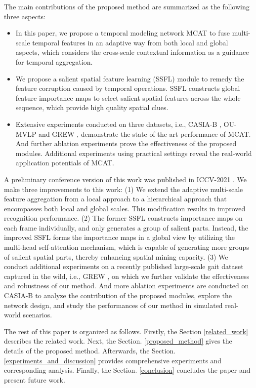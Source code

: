 \documentclass[journal]{IEEEtran}
\begin{document}
The main contributions of the proposed method are summarized as the following three aspects:
\begin{itemize}
\item[] In this paper, we propose a temporal modeling network MCAT to fuse multi-scale temporal features in an adaptive way from both local and global aspects, which considers the cross-scale contextual information as a guidance for temporal aggregation. 
   
\item[] We propose a salient spatial feature learning (SSFL) module to remedy the feature corruption caused by temporal operations. SSFL constructs global feature importance maps to select salient spatial features across the whole sequence, which provide high quality spatial clues.

\item[] Extensive experiments conducted on three datasets, i.e., CASIA-B \cite{yu2006framework}, OU-MVLP \cite{takemura2018multi} and GREW \cite{grew}, demonstrate the state-of-the-art performance of MCAT. And further ablation experiments prove the effectiveness of the proposed modules. Additional experiments using practical settings reveal the real-world application potentials of MCAT. 
\end{itemize}
 
A preliminary conference version of this work was published in ICCV-2021 \cite{cstl}. We make three improvements to this work: (1) We extend the adaptive multi-scale feature aggregation from a local approach to a hierarchical approach that encompasses both local and global scales. This modification results in improved recognition performance.  (2) The former SSFL constructs importance maps on each frame individually, and only generates a group of salient parts. Instead, the improved SSFL forms the importance maps in a global view by utilizing the multi-head self-attention mechanism, which is capable of generating more groups of salient spatial parts, thereby enhancing spatial mining capacity. (3) We conduct additional experiments on a recently published large-scale gait dataset captured in the wild, i.e., GREW \cite{grew}, on which we further validate the effectiveness and robustness of our method. And more ablation experiments are conducted on CASIA-B to analyze the contribution of the proposed modules, explore the network design, and study the performances of our method in simulated real-world scenarios.

The rest of this paper is organized as follows. Firstly, the Section \ref{related_work} describes the related work. Next, the Section. \ref{proposed_method} gives the details of the proposed method. Afterwards, the Section. \ref{experiments_and_discussion} provides comprehensive experiments and corresponding analysis. Finally, the Section. \ref{conclusion} concludes the paper and present future work.
\end{document}
